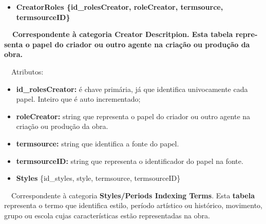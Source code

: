 \documentclass[letterpaper]{article}
\newcommand\textstyleStrongEmphasis[1]{\textbf{#1}}
\newcommand\liststyleLi{%
\renewcommand\labelitemi{{\textbullet}}
\renewcommand\labelitemii{[27A2?]}
\renewcommand\labelitemiii{{\textbullet}}
\renewcommand\labelitemiv{{\textbullet}}
}
\newcommand\liststyleLxiv{%
\renewcommand\labelitemi{[27A2?]}
\renewcommand\labelitemii{[27A2?]}
\renewcommand\labelitemiii{[27A2?]}
\renewcommand\labelitemiv{[27A2?]}
}
\begin{document}
\bigskip

\liststyleLi
\begin{itemize}
\item {\bfseries
CreatorRoles\textmd{ \{}\textmd{id\_rolesCreator}\textmd{, roleCreator,
termsource, termsourceID\}}}
\end{itemize}
{\bfseries
\foreignlanguage{english}{\textmd{\ \ Correspondente \`a categoria
}}\textstyleStrongEmphasis{\foreignlanguage{english}{Creator
Descritpion}}\foreignlanguage{english}{\textmd{. Esta
}}\textstyleStrongEmphasis{\foreignlanguage{english}{\textmd{tabela}}}\foreignlanguage{english}{\textmd{
representa o papel do criador ou outro agente na cria\c{c}\~ao ou
produ\c{c}\~ao da obra.}}}


\bigskip

{
\ \ Atributos:}

\liststyleLxiv
\begin{itemize}
\item {
\textbf{id\_rolesCreator: }\'e chave prim\'aria, j\'a que identifica
univocamente cada papel. Inteiro que \'e auto incrementado;}
\item {
\textbf{roleCreator: }string que representa o papel do criador ou outro
agente na cria\c{c}\~ao ou produ\c{c}\~ao da obra.}
\item {
\textbf{termsource: }string que identifica a fonte do papel.}
\item {
\textbf{termsourceID:} string que representa o identificador do papel na
fonte.}
\end{itemize}

\bigskip

\liststyleLi
\begin{itemize}
\item {
\textbf{Styles} \{id\_styles, style, termsource, termsourceID\}}
\end{itemize}
{
\foreignlanguage{english}{\ \ Correspondente \`a categoria
}\textstyleStrongEmphasis{\foreignlanguage{english}{Styles/Periods
Indexing Terms}}\foreignlanguage{english}{. Esta
}\textstyleStrongEmphasis{\foreignlanguage{english}{\textmd{tabela}}}\foreignlanguage{english}{
representa o termo que identifica estilo, per\'iodo art\'istico ou
hist\'orico, movimento, grupo ou escola cujas caracter\'isticas est\~ao
representadas na obra.}}
\end{document}
